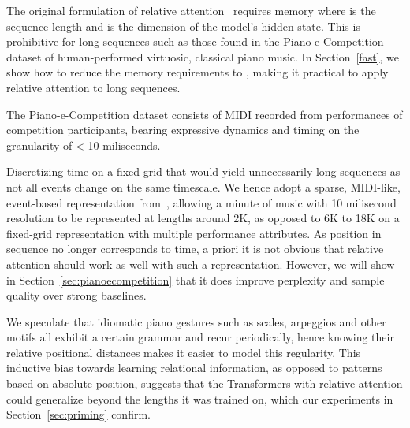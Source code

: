 \documentclass{article} \usepackage{iclr2019_conference,times}
\begin{document}
The original formulation of relative attention~\citep{shaw2018self} requires  memory where  is the sequence length and  is the dimension of the model's hidden state. This is prohibitive for long sequences such as those found in the Piano-e-Competition dataset of human-performed virtuosic, classical piano music. In Section~\ref{fast}, we show how to reduce the memory requirements to , making it practical to apply relative attention to long sequences.

The Piano-e-Competition dataset consists of MIDI recorded from performances of competition participants, bearing expressive dynamics and timing on the granularity of < 10 miliseconds. 
\iffalse
Discretizing time on a fixed grid will yield sequences that are too long.
\fi
Discretizing time on a fixed grid that would yield unnecessarily long sequences as not all events change on the same timescale.
We hence adopt a sparse, MIDI-like, event-based representation from~\citep{oore2018time}, allowing a minute of music with 10 milisecond resolution to be represented at lengths around 2K, as opposed to 6K to 18K on a fixed-grid representation with multiple performance attributes.
As position in sequence no longer corresponds to time, a priori it is not obvious that relative attention should work as well with such a representation.
However, we will show in Section~\ref{sec:pianoecompetition} that it does improve perplexity and sample quality over strong baselines.


We speculate that idiomatic piano gestures such as scales, arpeggios and other motifs all exhibit a certain grammar and recur periodically, hence knowing their relative positional distances makes it easier to model this regularity. 
This inductive bias towards learning relational information, as opposed to patterns based on absolute position, suggests that the Transformers with relative attention could generalize beyond the lengths it was trained on, which our experiments in Section~\ref{sec:priming} confirm.
\end{document}
